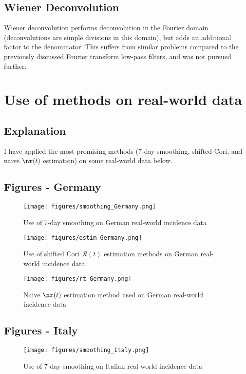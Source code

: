 \documentclass{article}
\newcommand{\nR}{\mathscr{R}}
\begin{document}
\subsection{Wiener Deconvolution}
Wiener deconvolution performs deconvolution in the Fourier domain (deconvolutions are simple divisions in this domain), but adds an additional factor to the denominator. This suffers from similar problems compared to the previously discussed Fourier transform low-pass filters, and was not pursued further.

\section{Use of methods on real-world data}
\subsection{Explanation}
I have applied the most promising methods (7-day smoothing, shifted Cori, and naive $\nr(t)$ estimation) on some real-world data below.


\subsection{Figures - Germany}
\begin{figure}[h!]
    \centering
    \texttt{[image: figures/smoothing\_Germany.png]}
    \caption{Use of 7-day smoothing on German real-world incidence data}
    \label{fig:my_label}
\end{figure}

\begin{figure}[h!]
    \centering
    \texttt{[image: figures/estim\_Germany.png]}
    \caption{Use of shifted Cori $\nR(t)$ estimation methods on German real-world incidence data}
    \label{fig:my_label}
\end{figure}

\clearpage
\begin{figure}[h!]
    \centering
    \texttt{[image: figures/rt\_Germany.png]}
    \caption{Naive $\nr(t)$ estimation method used on German real-world incidence data}
    \label{fig:my_label}
\end{figure}

\subsection{Figures - Italy}
\begin{figure}[h!]
    \centering
    \texttt{[image: figures/smoothing\_Italy.png]}
    \caption{Use of 7-day smoothing on Italian real-world incidence data}
    \label{fig:my_label}
\end{figure}
\end{document}
